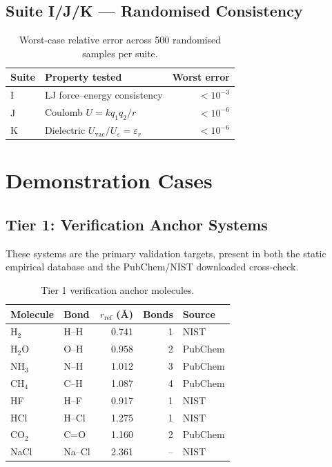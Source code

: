 \documentclass[11pt,twoside]{article}
\begin{document}
\subsection{Suite I/J/K --- Randomised Consistency}

\begin{table}[H]
\centering
\caption{Worst-case relative error across 500 randomised samples per suite.}
\label{tab:random}
\begin{tabular}{llr}
\toprule
\textbf{Suite} & \textbf{Property tested} & \textbf{Worst error} \\
\midrule
I & LJ force--energy consistency & $< 10^{-3}$ \\
J & Coulomb $U = k q_1 q_2 / r$ & $< 10^{-6}$ \\
K & Dielectric $U_{\mathrm{vac}} / U_\varepsilon = \varepsilon_r$ & $< 10^{-6}$ \\
\bottomrule
\end{tabular}
\end{table}


\section{Demonstration Cases}
\label{sec:demos}

\subsection{Tier 1: Verification Anchor Systems}

These systems are the primary validation targets, present in both the static
empirical database and the PubChem/NIST downloaded cross-check.

\begin{table}[H]
\centering
\caption{Tier 1 verification anchor molecules.}
\label{tab:tier1}
\begin{tabular}{llrrl}
\toprule
\textbf{Molecule} & \textbf{Bond} & \textbf{$r_{\mathrm{ref}}$ (\AA)} & \textbf{Bonds} & \textbf{Source} \\
\midrule
H$_2$  & H--H & 0.741 & 1 & NIST \\
H$_2$O & O--H & 0.958 & 2 & PubChem \\
NH$_3$ & N--H & 1.012 & 3 & PubChem \\
CH$_4$ & C--H & 1.087 & 4 & PubChem \\
HF     & H--F & 0.917 & 1 & NIST \\
HCl    & H--Cl& 1.275 & 1 & NIST \\
CO$_2$ & C=O  & 1.160 & 2 & PubChem \\
NaCl   & Na--Cl & 2.361 & -- & NIST \\
\bottomrule
\end{tabular}
\end{table}
\end{document}
